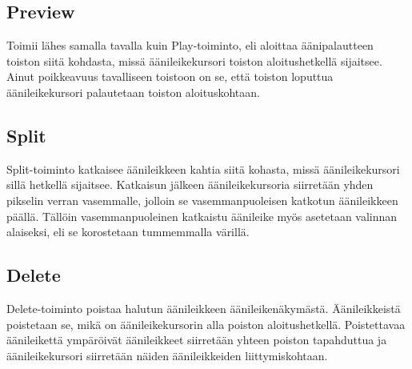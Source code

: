\documentclass[utf8]{gradu3}
\begin{document}
\subsection{Preview}

Toimii lähes samalla tavalla kuin Play-toiminto, eli aloittaa äänipalautteen toiston siitä kohdasta, missä äänileikekursori toiston aloitushetkellä sijaitsee. Ainut poikkeavuus tavalliseen toistoon on se, että toiston loputtua äänileikekursori palautetaan toiston aloituskohtaan. 

\subsection{Split}

Split-toiminto katkaisee äänileikkeen kahtia siitä kohasta, missä äänileikekursori sillä hetkellä sijaitsee. Katkaisun jälkeen äänileikekursoria siirretään yhden pikselin verran vasemmalle, jolloin se vasemmanpuoleisen katkotun äänileikkeen päällä. Tällöin vasemmanpuoleinen katkaistu äänileike myös asetetaan valinnan alaiseksi, eli se korostetaan tummemmalla värillä.

\subsection{Delete}

Delete-toiminto poistaa halutun äänileikkeen äänileikenäkymästä. Äänileikkeistä poistetaan se, mikä on äänileikekursorin alla poiston aloitushetkellä. Poistettavaa äänileikettä ympäröivät äänileikkeet siirretään yhteen poiston tapahduttua ja äänileikekursori siirretään näiden äänileikkeiden liittymiskohtaan.
\end{document}
